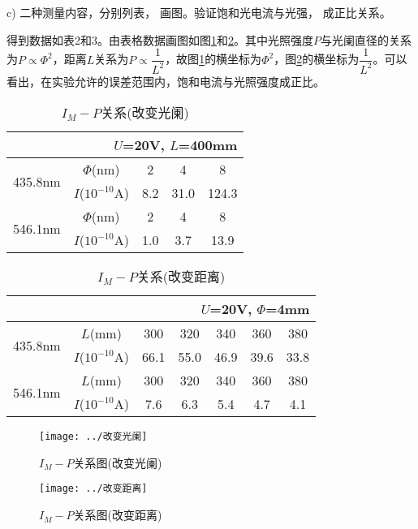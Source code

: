\documentclass[11pt]{article}
\begin{document}
c) 二种测量内容，分别列表， 画图。验证饱和光电流与光强， 成正比关系。\songti

得到数据如表2和3。由表格数据画图如图\ref{fig:4}和\ref{fig:5}。其中光照强度$ P $与光阑直径的关系为$ P\propto \Phi^2 $，距离$ L $关系为$ P\propto \dfrac{1}{L^2}  $，故图\ref{fig:4}的横坐标为$ \Phi^2 $，图\ref{fig:5}的横坐标为$ \dfrac{1}{L^2} $。可以看出，在实验允许的误差范围内，饱和电流与光照强度成正比。
\begin{table}[htbp]\small
	\caption{$ I_M-P $关系(改变光阑)}
	\centering
	\begin{tabular}{c|cccc}
		\multicolumn{5}{r}{$ U $=20V, $ L $=400mm}                    \\
		\toprule
		\multirow{2}{*}{435.8nm} & $ \Phi $(nm) & 2   & 4     & 8     \\
		& $ I $($ 10^{-10} $A)   & 8.2 & 31.0 & 124.3 \\
		\midrule
		\multirow{2}{*}{546.1nm} & $ \Phi $(nm) & 2   & 4     & 8     \\
		& $ I $($ 10^{-10} $A)    & 1.0 & 3.7   & 13.9 \\
		\bottomrule
	\end{tabular}
\end{table}
\begin{table}[htbp]
	\caption{$ I_M-P $关系(改变距离)}
	\centering
	\begin{tabular}{c|cccccc}
		\multicolumn{7}{r}{$ U $=20V, $ \Phi $=4mm}                                  \\
		\toprule
		\multirow{2}{*}{435.8nm} & $ L $(mm) & 300  & 320 & 340  & 360  & 380  \\
		& $ I $($ 10^{-10} $A)  & 66.1 & 55.0        & 46.9 & 39.6 & 33.8 \\
		\midrule
		\multirow{2}{*}{546.1nm} & $ L $(mm) & 300  & 320 & 340  & 360  & 380  \\
		& $ I $($ 10^{-10} $A)  & 7.6  & 6.3 & 5.4  & 4.7  & 4.1 \\
		\bottomrule
	\end{tabular}
\end{table}
\begin{figure}[htbp]
	\centering
	\texttt{[image: ../改变光阑]}
	\caption{$ I_M-P $关系图(改变光阑)}
	\label{fig:4}
\end{figure}
\begin{figure}
	\centering
	\texttt{[image: ../改变距离]}
	\caption{$ I_M-P $关系图(改变距离)}
	\label{fig:5}
\end{figure}
\end{document}
